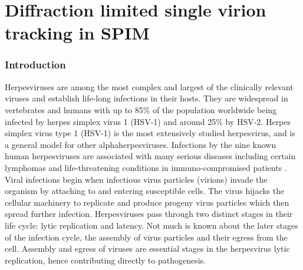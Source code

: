 \ifpdf
    \graphicspath{{Chapters/spt/Figs/Raster/}{Chapters/spt/Figs/PDF/}{Chapters/spt/Figs/}}
\else
    \graphicspath{{Chapters/spt/Figs/Vector/}{Chapters/spt/Figs/}}
\fi

\chapter{Diffraction limited single virion tracking in SPIM}

\subsection{Introduction}
Herpesviruses are among the most complex and largest of the clinically relevant viruses and establish life-long infections in their hosts.
They are widespread in vertebrates and humans with up to 85\% of the population worldwide being infected by herpes simplex virus 1 (HSV-1) and around 25\% by HSV-2.
Herpes simplex virus type 1 (HSV-1) is the most extensively studied herpesvirus, and is a general model for other alphaherpesviruses.
Infections by the nine known human herpesviruses are associated with many serious diseases including certain lymphomas and life-threatening conditions in immuno-compromised patients \cite{[1]}.
Viral infections begin when infectious virus particles (virions) invade the organism by attaching to and entering susceptible cells.
The virus hijacks the cellular machinery to replicate and produce progeny virus particles which then spread further infection.
Herpesviruses pass through two distinct stages in their life cycle: lytic replication and latency.
Not much is known about the later stages of the infection cycle, the assembly of virus particles and their egress from the cell.
Assembly and egress of viruses are essential stages in the herpesvirus lytic replication, hence contributing directly to pathogenesis.

